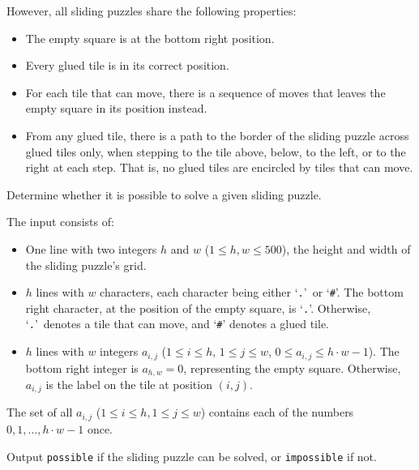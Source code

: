 However, all sliding puzzles share the following properties:
\begin{itemize}
\item The empty square is at the bottom right position.
\item Every glued tile is in its correct position.
\item For each tile that can move, there is a sequence of moves
  that leaves the empty square in its position instead.
\item From any glued tile,
  there is a path to the border of the sliding puzzle across glued tiles only,
  when stepping to the tile above, below, to the left, or to the right at each step.
  That is, no glued tiles are encircled by tiles that can move.
\end{itemize}

Determine whether it is possible to solve a given sliding puzzle.

\begin{Input}
  The input consists of:
  \begin{itemize}
    \item One line with two integers $h$ and $w$ ($1 \le h,w \le 500$), the
      height and width of the sliding puzzle's grid.
    \item $h$ lines with $w$ characters,
      each character being either `\texttt{.}'\ or `\texttt{\#}'.
      The bottom right character, at the position of the empty square,
      is `\texttt{.}'.
      Otherwise, `\texttt{.}'\ denotes a tile that can move,
      and `\texttt{\#}' denotes a glued tile.
    \item $h$ lines with $w$ integers $a_{i,j}$
      ($1 \le i \le h$, $1 \le j \le w$, $0 \le a_{i,j} \le h \cdot w - 1$).
      The bottom right integer is $a_{h,w} = 0$, representing the empty square.
      Otherwise, $a_{i,j}$ is the label on the tile at position $(i,j)$.
  \end{itemize}
  The set of all $a_{i,j}$ ($1 \le i \le h, 1 \le j \le w$)
  contains each of the numbers $0, 1, \dots, h \cdot w - 1$ once.
\end{Input}

\begin{Output}
  Output \texttt{possible} if the sliding puzzle can be solved, or
  \texttt{impossible} if not.
\end{Output}
